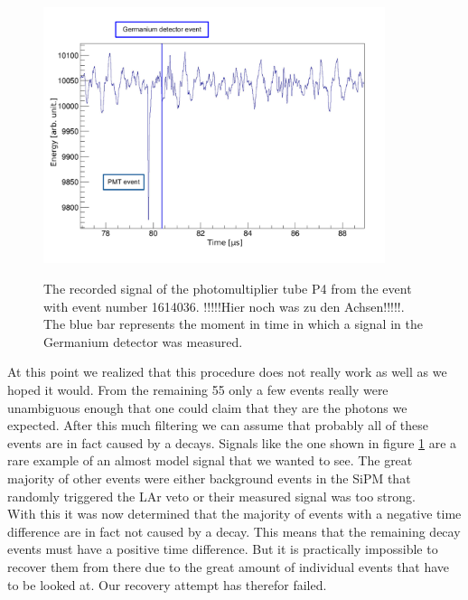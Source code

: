 \begin{figure}[t!]
	\centering
	\ifmakefigures%
	\includegraphics[width=100mm]{./Bilder/BeispielSignal.pdf}
	\fi%
	\label{fig:Trigger4}
	\caption{
    The recorded signal of the photomultiplier tube P4 from the event with event number 1614036. !!!!!Hier noch was zu den Achsen!!!!!. 
    The blue bar represents the moment in time in which a signal in the Germanium detector was measured.
	}
\end{figure}

At this point we realized that this procedure does not really work as well as we hoped it would.
From the remaining 55 only a few events really were unambiguous enough that one could claim that they are the photons we expected.
After this much filtering we can assume that probably all of these events are in fact caused by a \Kr decays.
Signals like the one shown in figure \ref{fig:Trigger4} are a rare example of an almost model signal that we wanted to see.
The great majority of other events were either background events in the SiPM that randomly triggered the LAr veto or their measured signal was too strong.  
\\

With this it was now determined that the majority of events with a negative time difference are in fact not caused by a \Kr decay.
This means that the remaining \Kr decay events must have a positive time difference.
But it is practically impossible to recover them from there due to the great amount of individual events that have to be looked at.
Our recovery attempt has therefor failed.
\\

